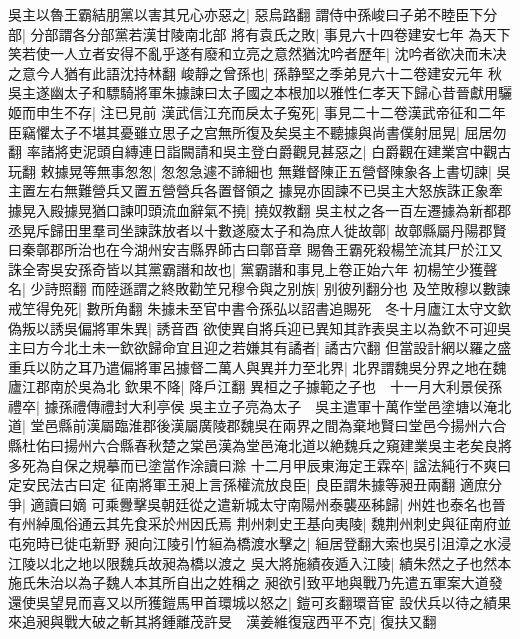吳主以魯王霸結朋黨以害其兄心亦惡之|{
	惡烏路翻}
謂侍中孫峻曰子弟不睦臣下分部|{
	分部謂各分部黨若漢甘陵南北部}
將有袁氏之敗|{
	事見六十四卷建安七年}
為天下笑若使一人立者安得不亂乎遂有廢和立亮之意然猶沈吟者歷年|{
	沈吟者欲决而未决之意今人猶有此語沈持林翻}
峻靜之曾孫也|{
	孫静堅之季弟見六十二卷建安元年}
秋吳主遂幽太子和驃騎將軍朱據諫曰太子國之本根加以雅性仁孝天下歸心昔晉獻用驪姬而申生不存|{
	注已見前}
漢武信江充而戾太子寃死|{
	事見二十二卷漢武帝征和二年}
臣竊懼太子不堪其憂雖立思子之宫無所復及矣吳主不聽據與尚書僕射屈晃|{
	屈居勿翻}
率諸將吏泥頭自縳連日詣闕請和吳主登白爵觀見甚惡之|{
	白爵觀在建業宫中觀古玩翻}
敕據晃等無事怱怱|{
	怱怱急遽不諦細也}
無難督陳正五營督陳象各上書切諫|{
	吳主置左右無難營兵又置五營營兵各置督領之}
據晃亦固諫不已吳主大怒族誅正象牽據晃入殿據晃猶口諫叩頭流血辭氣不撓|{
	撓奴教翻}
吳主杖之各一百左遷據為新都郡丞晃斥歸田里羣司坐諫誅放者以十數遂廢太子和為庶人徙故鄣|{
	故鄣縣屬丹陽郡賢曰秦鄣郡所治也在今湖州安吉縣界師古曰鄣音章}
賜魯王霸死殺楊笁流其尸於江又誅全寄吳安孫奇皆以其黨霸譖和故也|{
	黨霸譖和事見上卷正始六年}
初楊笁少獲聲名|{
	少詩照翻}
而陸遜謂之終敗勸笁兄穆令與之别族|{
	别彼列翻分也}
及笁敗穆以數諫戒笁得免死|{
	數所角翻}
朱據未至官中書令孫弘以詔書追賜死　冬十月廬江太守文欽偽叛以誘吳偏將軍朱異|{
	誘音酉}
欲使異自將兵迎已異知其詐表吳主以為欽不可迎吳主曰方今北土未一欽欲歸命宜且迎之若嫌其有譎者|{
	譎古穴翻}
但當設計網以羅之盛重兵以防之耳乃遣偏將軍呂據督二萬人與異并力至北界|{
	北界謂魏吳分界之地在魏廬江郡南於吳為北}
欽果不降|{
	降戶江翻}
異桓之子據範之子也　十一月大利景侯孫禮卒|{
	據孫禮傳禮封大利亭侯}
吳主立子亮為太子　吳主遣軍十萬作堂邑塗塘以淹北道|{
	堂邑縣前漢屬臨淮郡後漢屬廣陵郡魏吳在兩界之間為棄地賢曰堂邑今揚州六合縣杜佑曰揚州六合縣春秋楚之棠邑漢為堂邑淹北道以絶魏兵之窺建業吳主老矣良將多死為自保之規摹而已塗當作涂讀曰滁}
十二月甲辰東海定王霖卒|{
	諡法純行不爽曰定安民法古曰定}
征南將軍王昶上言孫權流放良臣|{
	良臣謂朱據等昶丑兩翻}
適庶分爭|{
	適讀曰嫡}
可乘釁擊吳朝廷從之遣新城太守南陽州泰襲巫秭歸|{
	州姓也泰名也晉有州綽風俗通云其先食采於州因氏焉}
荆州刺史王基向夷陵|{
	魏荆州刺史與征南府並屯宛時已徙屯新野}
昶向江陵引竹絙為橋渡水擊之|{
	絙居登翻大索也吳引沮漳之水浸江陵以北之地以限魏兵故昶為橋以渡之}
吳大將施績夜遁入江陵|{
	績朱然之子也然本施氏朱治以為子魏人本其所自出之姓稱之}
昶欲引致平地與戰乃先遣五軍案大道發還使吳望見而喜又以所獲鎧馬甲首環城以怒之|{
	鎧可亥翻環音宦}
設伏兵以待之績果來追昶與戰大破之斬其將鍾離茂許旻　漢姜維復寇西平不克|{
	復扶又翻}


